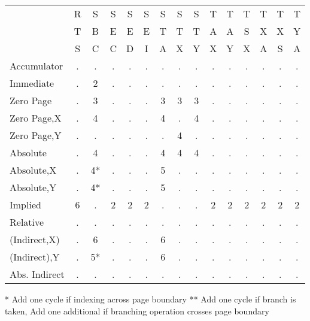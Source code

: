 \documentclass{article}
\begin{document}
  \begin{table}[H]
  \centering
  \begin{tabular}{|l|c c c c c c c c c c c c c c|}
  \hline
               &  R & S & S & S & S & S & S & S & T & T & T & T & T & T\\
               &  T & B & E & E & E & T & T & T & A & A & S & X & X & Y\\
               &  S & C & C & D & I & A & X & Y & X & Y & X & A & S & A\\
  \hline
  Accumulator  &  . & . & . & . & . & . & . & . & . & . & . & . & . & .\\
  Immediate    &  . & 2 & . & . & . & . & . & . & . & . & . & . & . & .\\
  Zero Page    &  . & 3 & . & . & . & 3 & 3 & 3 & . & . & . & . & . & .\\
  Zero Page,X  &  . & 4 & . & . & . & 4 & . & 4 & . & . & . & . & . & .\\
  Zero Page,Y  &  . & . & . & . & . & . & 4 & . & . & . & . & . & . & .\\
  Absolute     &  . & 4 & . & . & . & 4 & 4 & 4 & . & . & . & . & . & .\\
  Absolute,X   &  . & 4*& . & . & . & 5 & . & . & . & . & . & . & . & .\\
  Absolute,Y   &  . & 4*& . & . & . & 5 & . & . & . & . & . & . & . & .\\
  Implied      &  6 & . & 2 & 2 & 2 & . & . & . & 2 & 2 & 2 & 2 & 2 & 2\\
  Relative     &  . & . & . & . & . & . & . & . & . & . & . & . & . & .\\
  (Indirect,X) &  . & 6 & . & . & . & 6 & . & . & . & . & . & . & . & .\\
  (Indirect),Y &  . & 5*& . & . & . & 6 & . & . & . & . & . & . & . & .\\
  Abs. Indirect&  . & . & . & . & . & . & . & . & . & . & . & . & . & .\\
  \hline
  \end{tabular}
  \end{table}
     *  Add one cycle if indexing across page boundary
     ** Add one cycle if branch is taken, Add one additional if branching
        operation crosses page boundary
\end{document}
